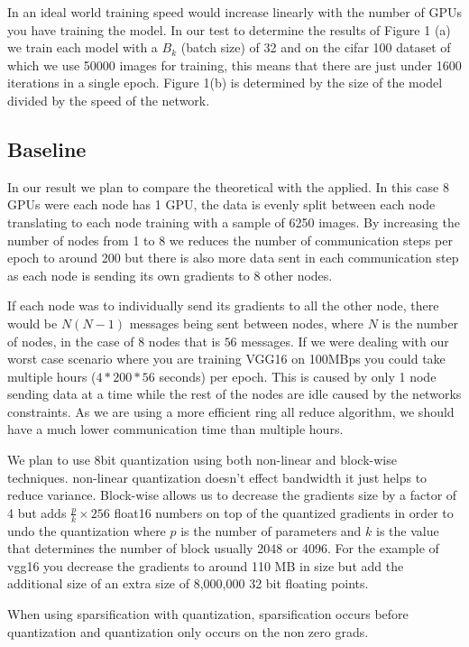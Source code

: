 \documentclass[11pt]{article}
\begin{document}
In an ideal world training speed would increase linearly with the number of GPUs you have training the model. In our test to determine the results of Figure 1 (a) we train each model with a $B_k$ (batch size) of 32 and on the cifar 100 dataset of which we use 50000 images for training, this means that there are just under 1600 iterations in a single epoch. Figure 1(b) is determined by the size of the model divided by the speed of the network.

\subsection{Baseline}
In our result we plan to compare the theoretical with the applied. In this case 8 GPUs were each node has 1 GPU, the data is evenly split between each node translating to each node training with a sample of 6250 images. By increasing the number of nodes from 1 to 8 we reduces the number of communication steps per epoch to around 200 but there is also more data sent in each communication step as each node is sending its own gradients to 8 other nodes. 

If each node was to individually send its gradients to all the other node, there would be $N(N-1)$ messages being sent between nodes, where $N$ is the number of nodes, in the case of 8 nodes that is $56$ messages. If we were dealing with our worst case scenario where you are training VGG16 on 100MBps you could take multiple hours ($4*200*56$ seconds) per epoch. This is caused by only 1 node sending data at a time while the rest of the nodes are idle caused by the networks constraints. As we are using a more efficient ring all reduce algorithm, we should have a much lower communication time than multiple hours.

We plan to use 8bit quantization using both non-linear and block-wise techniques. non-linear quantization doesn't effect bandwidth it just helps to reduce variance. Block-wise allows us to decrease the gradients size by a factor of 4 but adds $\frac{p}{k}\times 256$ float16 numbers on top of the quantized gradients in order to undo the quantization where $p$ is the number of parameters and $k$ is the value that determines the number of block usually 2048 or 4096. For the example of vgg16 you decrease the gradients to around 110 MB in size but add the additional size of an extra size of 8,000,000 32 bit floating points.

When using sparsification with quantization, sparsification occurs before quantization and quantization only occurs on the non zero grads.
\end{document}
